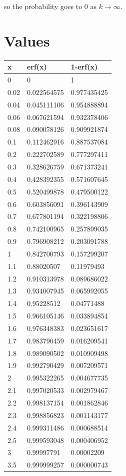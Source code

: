 \documentclass{article}
\begin{document}
so the probability goes to 0 as $k\rightarrow \infty$.

\section{Values}

\begin{table}[]

\begin{tabular}{|l|l|l|}
\hline
 x & erf(x) & 1-erf(x) \hline \\ \hline
0 & 0  & 1\\ \hline
0.02 & 0.022564575  & 0.977435425\\ \hline
0.04 & 0.045111106  & 0.954888894\\ \hline
0.06 & 0.067621594  & 0.932378406\\ \hline
0.08 & 0.090078126  & 0.909921874\\ \hline
0.1 & 0.112462916  & 0.887537084\\ \hline
0.2 & 0.222702589  & 0.777297411\\ \hline
0.3 & 0.328626759  & 0.671373241\\ \hline
0.4 & 0.428392355  & 0.571607645\\ \hline
0.5 & 0.520499878  & 0.479500122\\ \hline
0.6 & 0.603856091  & 0.396143909\\ \hline
0.7 & 0.677801194  & 0.322198806\\ \hline
0.8 & 0.742100965  & 0.257899035\\ \hline
0.9 & 0.796908212  & 0.203091788\\ \hline
1 & 0.842700793  & 0.157299207\\ \hline
1.1 & 0.88020507  & 0.11979493\\ \hline
1.2 & 0.910313978  & 0.089686022\\ \hline
1.3 & 0.934007945  & 0.065992055\\ \hline
1.4 & 0.95228512  & 0.04771488\\ \hline
1.5 & 0.966105146  & 0.033894854\\ \hline
1.6 & 0.976348383  & 0.023651617\\ \hline
1.7 & 0.983790459  & 0.016209541\\ \hline
1.8 & 0.989090502  & 0.010909498\\ \hline
1.9 & 0.992790429  & 0.007209571\\ \hline
2 & 0.995322265  & 0.004677735\\ \hline
2.1 & 0.997020533  & 0.002979467\\ \hline
2.2 & 0.998137154  & 0.001862846\\ \hline
2.3 & 0.998856823  & 0.001143177\\ \hline
2.4 & 0.999311486  & 0.000688514\\ \hline
2.5 & 0.999593048  & 0.000406952\\ \hline
3 & 0.99997791  & 0.00002209\\ \hline
3.5 & 0.999999257 &  0.000000743 \\ \hline

\end{tabular}

\end{table}
\end{document}
